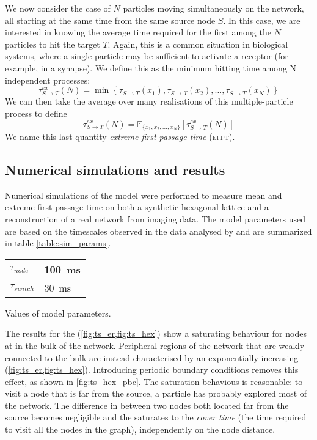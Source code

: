 We now consider the case of $N$ particles moving simultaneously on the network, all starting at the same time from the same source node $S$. In this case, we are interested in knowing the average time required for the first among the $N$ particles to hit the target $T$. Again, this is a common situation in biological systems, where a single particle may be sufficient to activate a receptor (for example, in a synapse). We define this as the minimum hitting time among N independent processes:
\begin{equation}
  \tau^{ex}_{S \to T}(N) = \min \left\{ \tau_{S \to T}(x_1), \tau_{S \to T}(x_2), \dots, \tau_{S \to T}(x_N) \right\}
\end{equation}
We can then take the average over many realisations of this multiple-particle process to define
\begin{equation}
  \bar{\tau}^{ex}_{S \to T}(N) = \mathbb{E}_{\{x_1, x_2, \dots, x_N\}} \left[ \tau^{ex}_{S \to T}(N) \right]
\end{equation}
We name this last quantity \textit{extreme first passage time} (\textsc{efpt}).

\subsection{Numerical simulations and results}

Numerical simulations of the model were performed to measure mean and extreme first passage time on both a synthetic hexagonal lattice and a reconstruction of a real network from  imaging data. The model parameters used are based on the timescales observed in the  data analysed by \citeauthor{holcman2018single} and are summarized in table \ref{table:sim_params}.

\begin{margintable}
  \sffamily
  \vspace{1em}
  \begin{tabular*}{\textwidth}{@{}ll@{}}
    \hline
    $\tau_{node}$   & \SI{100}{\milli\second}  \\
    \hline
    $\tau_{switch}$ & \SI{30}{\milli\second}  \\
    \hline
  \end{tabular*}
  \caption{Values of model parameters.}\label{table:sim_params}
\end{margintable}

The results for the  (\cref{fig:ts_er,fig:ts_hex}) show a saturating behaviour for nodes at in the bulk of the network. Peripheral regions of the network that are weakly connected to the bulk are instead characterised by an exponentially increasing  (\cref{fig:ts_er,fig:ts_hex}). Introducing periodic boundary conditions removes this effect, as shown in \cref{fig:ts_hex_pbc}. The saturation behavious is reasonable: to visit a node that is far from the source, a particle has probably explored most of the network. The difference in  between two nodes both located far from the source becomes negligible and the  saturates to the \emph{cover time} (the time required to visit all the nodes in the graph), independently on the node distance.

